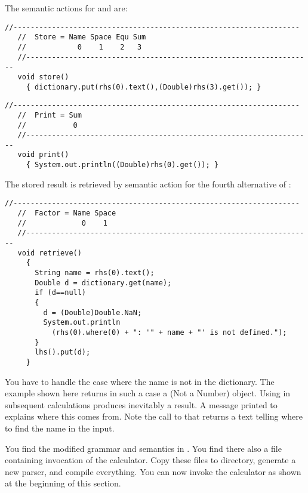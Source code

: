 The semantic actions for  and  are:

\small
\begin{Verbatim}[frame=single,framesep=2mm,samepage=true,xleftmargin=15mm,xrightmargin=15mm,baselinestretch=0.8]
   //-------------------------------------------------------------------
   //  Store = Name Space Equ Sum
   //            0    1    2   3
   //-------------------------------------------------------------------
   void store()
     { dictionary.put(rhs(0).text(),(Double)rhs(3).get()); }
\end{Verbatim}
\normalsize

\small
\begin{Verbatim}[frame=single,framesep=2mm,samepage=true,xleftmargin=15mm,xrightmargin=15mm,baselinestretch=0.8]
   //-------------------------------------------------------------------
   //  Print = Sum
   //           0
   //-------------------------------------------------------------------
   void print()
     { System.out.println((Double)rhs(0).get()); }
\end{Verbatim}
\normalsize

\newpage
The stored result is retrieved by semantic action
for the fourth alternative of :

\small
\begin{Verbatim}[frame=single,framesep=2mm,samepage=true,xleftmargin=15mm,xrightmargin=15mm,baselinestretch=0.8]
   //-------------------------------------------------------------------
   //  Factor = Name Space
   //             0    1
   //-------------------------------------------------------------------
   void retrieve()
     {
       String name = rhs(0).text();
       Double d = dictionary.get(name);
       if (d==null)
       {
         d = (Double)Double.NaN;
         System.out.println
           (rhs(0).where(0) + ": '" + name + "' is not defined.");
       }
       lhs().put(d);
     }
\end{Verbatim}
\normalsize

You have to handle the case where the name is not in the dictionary.
The example shown here returns in such a case a  (Not a Number) object. 
Using  in subsequent calculations produces inevitably a  result.
A message printed to  explains where this  comes from.
Note the call to  that returns a text telling where to find the name
in the input. 

You find the modified grammar and semantics in .
You find there also a file  containing invocation of the calculator.
Copy these files to  directory, generate a new parser, and compile
everything.
You can now invoke the calculator as shown at the beginning of this section.
